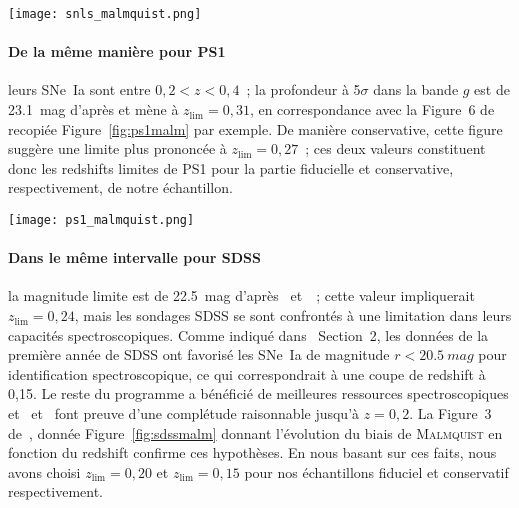 \documentclass[../main/main.tex]{subfiles}
\begin{document}
\begin{SCfigure}[0.7][ht!]
    \centering
    \texttt{[image: snls\_malmquist.png]}
    \caption[Biais de \textsc{Malmquist} moyen en fonction du redshift pour le
    sondage SNLS]{Biais de \textsc{Malmquist} et de sélection spectroscopique
        moyen en fonction du redshift pour le sondage SNLS d'après des
        simulations.\smallbreak Figure de~\cite{perrett2010}.}
    \label{fig:snlsmalm}
\end{SCfigure}

\paragraph*{De la même manière pour PS1} leurs SNe~Ia sont entre $0,2 < z <
0,4$~; la profondeur à 5$\sigma$ dans la bande $g$ est de \SI{23,1}{mag} d'après
\cite{rest2014} et mène à $z_{\lim}=0,31$, en correspondance avec la Figure~6
de~\cite{scolnic2018} recopiée Figure~\ref{fig:ps1malm} par exemple. De manière
conservative, cette figure suggère une limite plus prononcée à $z_{\lim}=0,27$~;
ces deux valeurs constituent donc les redshifts limites de PS1 pour la partie
fiducielle et conservative, respectivement, de notre échantillon.

\begin{SCfigure}[0.7][ht!]
    \centering
    \texttt{[image: ps1\_malmquist.png]}
    \caption[Biais de \textsc{Malmquist} moyen en fonction du redshift pour le
    sondage PS1]{Biais de \textsc{Malmquist} moyen dû aux effets de sélection
        en fonction du redshift pour le sondage PS1, d'après des simulations et
        pour deux modèles de dispersion intrinsèques différents et leur moyenne.
        \smallbreak Figure de~\cite{scolnic2018}.}
    \label{fig:ps1malm}
\end{SCfigure}

\paragraph*{Dans le même intervalle pour SDSS} la magnitude limite est de
\SI{22,5}{mag} d'après~\cite{dilday2008} et~\cite{sako2008}~; cette valeur 
impliquerait $z_{\lim}=0,24$, mais les sondages SDSS se sont confrontés à une
limitation dans leurs capacités spectroscopiques. Comme indiqué
dans~\cite{kessler2009a} Section~2, les données de la première année de SDSS ont
favorisé les SNe~Ia de magnitude $r < \SI{20,5}{mag}$ pour identification
spectroscopique, ce qui correspondrait à une coupe de redshift à 0,15. Le reste
du programme a bénéficié de meilleures ressources spectroscopiques
et~\cite{kessler2009a} et~\cite{dilday2008} font preuve d'une complétude
raisonnable jusqu'à $z=0,2$. La Figure~3 de~\cite{conley2011}, donnée
Figure~\ref{fig:sdssmalm} donnant l'évolution du biais de \textsc{Malmquist} en
fonction du redshift confirme ces hypothèses. En nous basant sur ces faits, nous
avons choisi $z_{\lim}=0,20$ et $z_{\lim}=0,15$ pour nos échantillons fiduciel
et conservatif respectivement.
\end{document}

